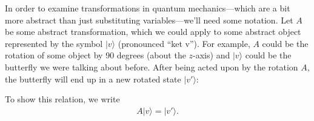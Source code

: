 In order to examine transformations in quantum mechanics---which are a bit more abstract than just substituting variables---we'll need some notation. Let $A$ be some abstract transformation, which we could apply to some abstract object represented by the symbol $|v\rangle$ (pronounced ``ket v''). For example, $A$ could be the rotation of some object by 90 degrees (about the $z$-axis) and $|v\rangle$ could be the butterfly we were talking about before. After being acted upon by the rotation $A$, the butterfly will end up in a new rotated state $|v'\rangle$:
\begin{center}
    \centering
    \begin{minipage}{0.4\textwidth}
        \centering
    \end{minipage}
    \begin{minipage}{0.1\textwidth}
        \centering
    \end{minipage}
    \begin{minipage}{0.4\textwidth}
        \centering
    \end{minipage}
\end{center}
To show this relation, we write
\begin{align*}
    A|v\rangle = |v'\rangle.
\end{align*}

